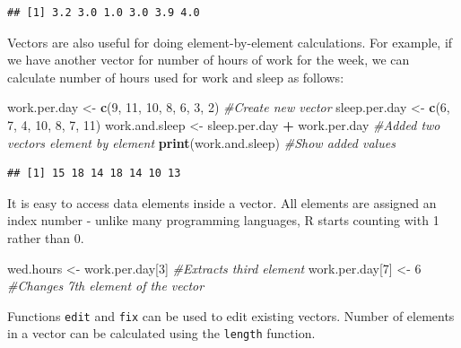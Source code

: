 \documentclass[]{krantz}
\makeatletter
\newenvironment{Shaded}{\begin{snugshade}}{\end{snugshade}}
\newcommand{\KeywordTok}[1]{\textcolor[rgb]{0.27,0.27,0.27}{\textbf{#1}}}
\newcommand{\DecValTok}[1]{\textcolor[rgb]{0.06,0.06,0.06}{#1}}
\newcommand{\StringTok}[1]{\textcolor[rgb]{0.5,0.5,0.5}{#1}}
\newcommand{\CommentTok}[1]{\textcolor[rgb]{0.56,0.35,0.01}{\textit{#1}}}
\newcommand{\OperatorTok}[1]{\textcolor[rgb]{0.81,0.36,0.00}{\textbf{#1}}}
\newcommand{\NormalTok}[1]{#1}
\newenvironment{kframe}{%
\medskip{}
\setlength{\fboxsep}{.8em}
 \def\at@end@of@kframe{}%
 \ifinner\ifhmode%
  \def\at@end@of@kframe{\end{minipage}}%
  \begin{minipage}{\columnwidth}%
 \fi\fi%
 \def\FrameCommand##1{\hskip\@totalleftmargin \hskip-\fboxsep
 \colorbox{shadecolor}{##1}\hskip-\fboxsep
     \hskip-\linewidth \hskip-\@totalleftmargin \hskip\columnwidth}%
 \MakeFramed {\advance\hsize-\width
   \@totalleftmargin\z@ \linewidth\hsize
   \@setminipage}}%
 {\par\unskip\endMakeFramed%
 \at@end@of@kframe}
\renewenvironment{Shaded}{\begin{kframe}}{\end{kframe}}
\theoremstyle{definition}
\theoremstyle{definition}
\theoremstyle{definition}
\theoremstyle{remark}
\makeatother
\begin{document}
\begin{verbatim}
## [1] 3.2 3.0 1.0 3.0 3.9 4.0
\end{verbatim}

Vectors are also useful for doing element-by-element calculations. For
example, if we have another vector for number of hours of work for the
week, we can calculate number of hours used for work and sleep as
follows:

\begin{Shaded}
\begin{Highlighting}[]
\NormalTok{work.per.day <-}\StringTok{ }\KeywordTok{c}\NormalTok{(}\DecValTok{9}\NormalTok{, }\DecValTok{11}\NormalTok{, }\DecValTok{10}\NormalTok{, }\DecValTok{8}\NormalTok{, }\DecValTok{6}\NormalTok{, }\DecValTok{3}\NormalTok{, }\DecValTok{2}\NormalTok{) }\CommentTok{#Create new vector}
\NormalTok{sleep.per.day <-}\StringTok{ }\KeywordTok{c}\NormalTok{(}\DecValTok{6}\NormalTok{, }\DecValTok{7}\NormalTok{, }\DecValTok{4}\NormalTok{, }\DecValTok{10}\NormalTok{, }\DecValTok{8}\NormalTok{, }\DecValTok{7}\NormalTok{, }\DecValTok{11}\NormalTok{)}
\NormalTok{work.and.sleep <-}\StringTok{ }\NormalTok{sleep.per.day }\OperatorTok{+}\StringTok{ }\NormalTok{work.per.day }
\CommentTok{#Added two vectors element by element}
\KeywordTok{print}\NormalTok{(work.and.sleep) }\CommentTok{#Show added values}
\end{Highlighting}
\end{Shaded}

\begin{verbatim}
## [1] 15 18 14 18 14 10 13
\end{verbatim}

It is easy to access data elements inside a vector. All elements are
assigned an index number - unlike many programming languages, R starts
counting with 1 rather than 0.

\begin{Shaded}
\begin{Highlighting}[]
\NormalTok{wed.hours <-}\StringTok{ }\NormalTok{work.per.day[}\DecValTok{3}\NormalTok{] }\CommentTok{#Extracts third element}
\NormalTok{work.per.day[}\DecValTok{7}\NormalTok{] <-}\StringTok{ }\DecValTok{6} \CommentTok{#Changes 7th element of the vector}
\end{Highlighting}
\end{Shaded}

Functions \texttt{edit} and \texttt{fix} can be used to edit existing
vectors. Number of elements in a vector can be calculated using the
\texttt{length} function.
\end{document}
